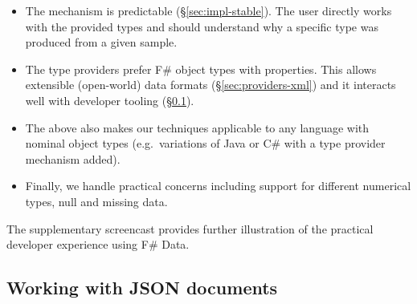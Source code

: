 \documentclass[10pt]{sigplanconf}
\newcommand{\kvd}[1]{\textnormal{\textcolor{kvdclr}{\sffamily #1}}}
\begin{document}
\begin{itemize}
\item The mechanism is predictable (\S\ref{sec:impl-stable}). The user directly works with the 
  provided types and should understand why a specific type was produced from a given sample.

\item The type providers prefer F\# object types with properties. This allows extensible 
  (open-world) data formats (\S\ref{sec:providers-xml}) and it interacts well with developer tooling
  (\S\ref{sec:providers-json}). 

\item The above also makes our techniques applicable to any language with nominal 
  object types (e.g.~variations of Java or C\# with a type provider mechanism added).

\item Finally, we handle practical concerns including
  support for different numerical types, \kvd{null} and missing data.
\end{itemize}

\noindent
The supplementary screencast provides further illustration of the practical developer
experience using F\# Data.
  

\subsection{Working with JSON documents}
\label{sec:providers-json}
\end{document}

